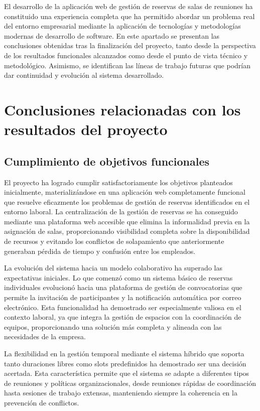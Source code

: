 
El desarrollo de la aplicación web de gestión de reservas de salas de reuniones ha constituido una experiencia completa que ha permitido abordar un problema real del entorno empresarial mediante la aplicación de tecnologías y metodologías modernas de desarrollo de software. En este apartado se presentan las conclusiones obtenidas tras la finalización del proyecto, tanto desde la perspectiva de los resultados funcionales alcanzados como desde el punto de vista técnico y metodológico. Asimismo, se identifican las líneas de trabajo futuras que podrían dar continuidad y evolución al sistema desarrollado.

\section{Conclusiones relacionadas con los resultados del proyecto}\label{conclusiones-relacionadas-resultados-proyecto}
\subsection{Cumplimiento de objetivos funcionales}\label{cumplimiento-objetivos-funcionales}
El proyecto ha logrado cumplir satisfactoriamente los objetivos planteados inicialmente, materializándose en una aplicación web completamente funcional que resuelve eficazmente los problemas de gestión de reservas identificados en el entorno laboral. La centralización de la gestión de reservas se ha conseguido mediante una plataforma web accesible que elimina la informalidad previa en la asignación de salas, proporcionando visibilidad completa sobre la disponibilidad de recursos y evitando los conflictos de solapamiento que anteriormente generaban pérdida de tiempo y confusión entre los empleados.

La evolución del sistema hacia un modelo colaborativo ha superado las expectativas iniciales. Lo que comenzó como un sistema básico de reservas individuales evolucionó hacia una plataforma de gestión de convocatorias que permite la invitación de participantes y la notificación automática por correo electrónico. Esta funcionalidad ha demostrado ser especialmente valiosa en el contexto laboral, ya que integra la gestión de espacios con la coordinación de equipos, proporcionando una solución más completa y alineada con las necesidades de la empresa.

La flexibilidad en la gestión temporal mediante el sistema híbrido que soporta tanto duraciones libres como slots predefinidos ha demostrado ser una decisión acertada. Esta característica permite que el sistema se adapte a diferentes tipos de reuniones y políticas organizacionales, desde reuniones rápidas de coordinación hasta sesiones de trabajo extensas, manteniendo siempre la coherencia en la prevención de conflictos.

